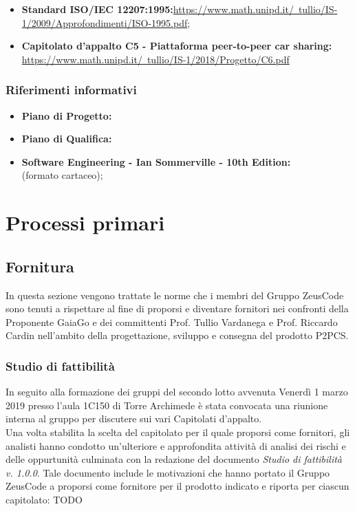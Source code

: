 \documentclass[a4paper]{article}
\newcommand{\GroupName} {Gruppo ZeusCode }
\begin{document}
\begin{itemize}
	\item  \textbf{Standard ISO/IEC 12207:1995:}\href{https://www.math.unipd.it/~tullio/IS-1/2009/Approfondimenti/ISO_12207-1995.pdf}{https://www.math.unipd.it/~tullio/IS-1/2009/Approfondimenti/ISO-1995.pdf};
	\item \textbf{Capitolato d'appalto C5 - Piattaforma peer-to-peer car sharing:} \href{https://www.math.unipd.it/~tullio/IS- 1/2018/Progetto/C6.pdf}{https://www.math.unipd.it/~tullio/IS-1/2018/Progetto/C6.pdf}
\end{itemize}

\subsubsection {Riferimenti informativi}
\begin{itemize}
	\item \textbf{Piano di Progetto:}
	\item \textbf{Piano di Qualifica:}
	\item \textbf{Software Engineering - Ian Sommerville - 10th Edition: \\}(formato cartaceo);
\end{itemize}
\section {Processi primari}
	\subsection {Fornitura}
	In questa sezione vengono trattate le norme che i membri del \GroupName sono tenuti a rispettare al fine di proporsi e diventare fornitori nei confronti della Proponente GaiaGo e dei committenti Prof. Tullio Vardanega e Prof. Riccardo Cardin nell'ambito della progettazione, sviluppo e consegna del prodotto P2PCS.
		\subsubsection {Studio di fattibilità}
		In seguito alla formazione dei gruppi del secondo lotto avvenuta Venerdì 1 marzo 2019 presso l'aula 1C150 di Torre Archimede è stata convocata una riunione interna al gruppo per discutere sui vari Capitolati d'appalto. \\ Una volta stabilita la scelta del capitolato per il quale proporsi come fornitori, gli analisti hanno condotto un'ulteriore e approfondita attività di analisi dei rischi e delle oppurtunità culminata con la redazione del documento \textit{Studio di fattibilità v. 1.0.0}. Tale documento include le motivazioni che hanno portato il \GroupName a proporsi come fornitore per il prodotto indicato e riporta per ciascun capitolato: TODO
\end{document}
